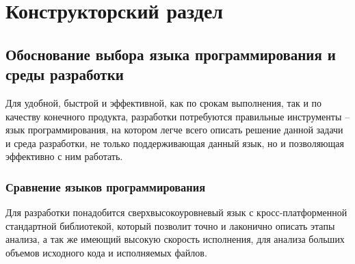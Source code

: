 \chapter{Конструкторский раздел}\label{ch:ch2}
\section{Обоснование выбора языка программирования и среды разработки}\label{sec:ch2/sec1}
Для удобной, быстрой и эффективной, как по срокам выполнения, так и по качеству конечного продукта,
разработки {\ProgModule} потребуются правильные инструменты -- язык программирования, на котором 
легче всего описать решение данной задачи и среда разработки, не только поддерживающая данный язык,
но и позволяющая эффективно с ним работать.

\subsection{Сравнение языков программирования}\label{sec:ch2/sec1/sub1}
Для разработки {\ProgModule} понадобится сверхвысокоуровневый язык с кросс-платформенной
стандартной библиотекой, который позволит точно и лаконично описать этапы анализа,
а так же имеющий высокую скорость исполнения, для анализа больших объемов исходного кода и
исполняемых файлов.

